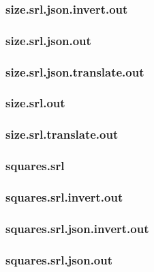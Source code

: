 \subsubsection{size.srl.json.invert.out}
\label{app:size_srl.json.invert.out}

\subsubsection{size.srl.json.out}
\label{app:size_srl.json.out}

\subsubsection{size.srl.json.translate.out}
\label{app:size_srl.json.translate.out}

\subsubsection{size.srl.out}
\label{app:size_srl.out}

\subsubsection{size.srl.translate.out}
\label{app:size_srl.translate.out}

\subsubsection{squares.srl}
\label{app:squares_srl}

\subsubsection{squares.srl.invert.out}
\label{app:squares_srl.invert.out}

\subsubsection{squares.srl.json.invert.out}
\label{app:squares_srl.json.invert.out}

\subsubsection{squares.srl.json.out}
\label{app:squares_srl.json.out}

